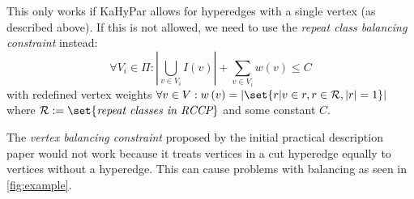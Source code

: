 \documentclass{article}
\DeclarePairedDelimiter\set\{\}
\begin{document}
	This only works if KaHyPar allows for hyperedges with a single vertex (as described above). If this is not allowed, we need to use the \textit{repeat class balancing constraint} instead: \[ \forall V_i \in \Pi: \left|\bigcup_{v \in V_i}I\left(v\right)\right| + \sum_{v \in V_i}w\left(v\right) \leq C\] with redefined vertex weights $\forall v \in V: w\left(v\right)=\left|\set{r | v \in r, r \in \mathcal{R}, \left|r\right|=1} \right|$ where $\mathcal{R} := \set{\textit{repeat classes in RCCP}}$ and some constant $C$.
	
	The \textit{vertex balancing constraint} proposed by the initial practical description paper would not work because it treats vertices in a cut hyperedge equally to vertices without a hyperedge. This can cause problems with balancing as seen in \cref{fig:example}.
\end{document}
